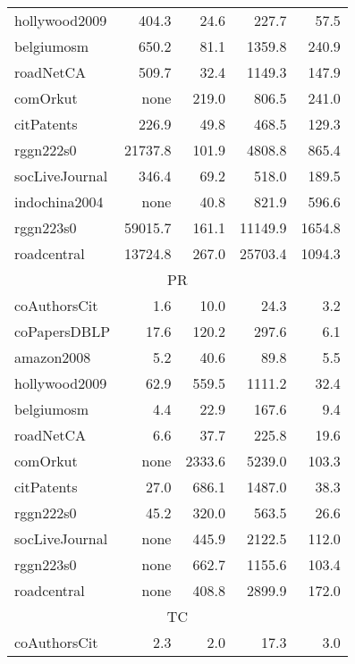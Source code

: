\begin{table}[tbp]
\begin{center}
\begin{tabular}{|l|r|r|r|r|}
        \rowcolor{black!2 } hollywood2009&404.3&24.6&227.7&57.5\\
        \rowcolor{black!10} belgiumosm&650.2&81.1&1359.8&240.9\\
        \rowcolor{black!2 } roadNetCA&509.7&32.4&1149.3&147.9\\
        \rowcolor{black!10} comOrkut& none&219.0&806.5&241.0\\
        \rowcolor{black!2 } citPatents&226.9&49.8&468.5&129.3\\
        \rowcolor{black!10} rggn222s0&21737.8&101.9&4808.8&865.4\\
        \rowcolor{black!2 } socLiveJournal&346.4&69.2&518.0&189.5\\
        \rowcolor{black!10} indochina2004& none&40.8&821.9&596.6\\
        \rowcolor{black!2 } rggn223s0&59015.7&161.1&11149.9&1654.8\\
        \rowcolor{black!10} roadcentral&13724.8&267.0&25703.4&1094.3\\
        \hline
        \hline
        \multicolumn{5}{|c|}{PR} \\
        \hline
        \rowcolor{black!10} coAuthorsCit&1.6&10.0&24.3&3.2\\
        \rowcolor{black!2 } coPapersDBLP&17.6&120.2&297.6&6.1\\
        \rowcolor{black!10} amazon2008&5.2&40.6&89.8&5.5\\
        \rowcolor{black!2 } hollywood2009&62.9&559.5&1111.2&32.4\\
        \rowcolor{black!10} belgiumosm&4.4&22.9&167.6&9.4\\
        \rowcolor{black!2 } roadNetCA&6.6&37.7&225.8&19.6\\
        \rowcolor{black!10} comOrkut& none&2333.6&5239.0&103.3\\
        \rowcolor{black!2 } citPatents&27.0&686.1&1487.0&38.3\\
        \rowcolor{black!10} rggn222s0&45.2&320.0&563.5&26.6\\
        \rowcolor{black!2 } socLiveJournal& none&445.9&2122.5&112.0\\
        \rowcolor{black!10} rggn223s0& none&662.7&1155.6&103.4\\
        \rowcolor{black!2 } roadcentral& none&408.8&2899.9&172.0\\
        \hline
        \hline
        \multicolumn{5}{|c|}{TC} \\
        \hline
        \rowcolor{black!10} coAuthorsCit&2.3&2.0&17.3&3.0\\

\end{tabular}
\end{center}
\end{table}
